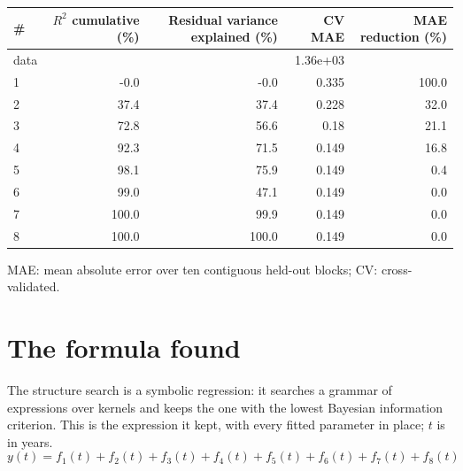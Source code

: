 \documentclass[11pt,a4paper]{article}
\begin{document}
\begin{center}
\begin{tabular}{lrrrr}
\toprule
\# & $R^2$ cumulative (\%) & Residual variance explained (\%) & CV MAE & MAE reduction (\%) \\
\midrule
data & & & 1.36e+03 & \\
1 & -0.0 & -0.0 & 0.335 & 100.0 \\
2 & 37.4 & 37.4 & 0.228 & 32.0 \\
3 & 72.8 & 56.6 & 0.18 & 21.1 \\
4 & 92.3 & 71.5 & 0.149 & 16.8 \\
5 & 98.1 & 75.9 & 0.149 & 0.4 \\
6 & 99.0 & 47.1 & 0.149 & 0.0 \\
7 & 100.0 & 99.9 & 0.149 & 0.0 \\
8 & 100.0 & 100.0 & 0.149 & 0.0 \\
\bottomrule
\end{tabular}
\end{center}

MAE: mean absolute error over ten contiguous held-out blocks; CV: cross-validated.

\section*{The formula found}

The structure search is a symbolic regression: it searches a grammar of expressions over kernels and keeps the one with the lowest Bayesian information criterion. This is the expression it kept, with every fitted parameter in place; $t$ is in years.
\begin{dmath*}
y(t) = f_{1}(t) + f_{2}(t) + f_{3}(t) + f_{4}(t) + f_{5}(t) + f_{6}(t) + f_{7}(t) + f_{8}(t)
\end{dmath*}
\end{document}
